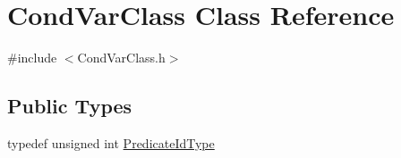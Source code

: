 \hypertarget{classCondVarClass}{}\section{Cond\+Var\+Class Class Reference}
\label{classCondVarClass}


{\ttfamily \#include $<$Cond\+Var\+Class.\+h$>$}

\subsection*{Public Types}
\begin{DoxyCompactItemize}
\item 
typedef unsigned int \hyperlink{classCondVarClass_a8e27f99972b8b95f064d6657a4583a5b}{Predicate\+Id\+Type}
\end{DoxyCompactItemize}
